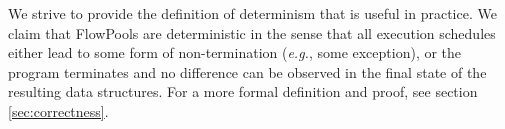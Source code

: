\documentclass[runningheads,a4paper]{llncs}
\begin{document}

We strive to provide the definition of determinism that is useful in practice.
We claim that FlowPools are deterministic in the sense that all
execution schedules either lead to some form of non-termination (\textit{e.g.}, some
exception), or the program terminates and no difference can be observed in the final state of the
resulting data structures. For a more formal definition and proof, see section
\ref{sec:correctness}.

%
%


\end{document}
